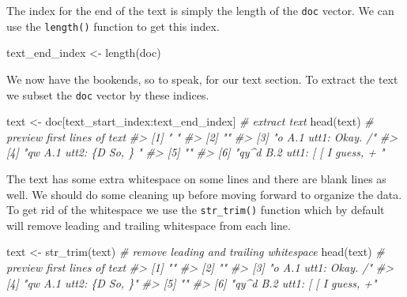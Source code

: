 \documentclass[
]{article}
\newenvironment{Shaded}{\begin{snugshade}}{\end{snugshade}}
\newcommand{\CommentTok}[1]{\textcolor[rgb]{0.56,0.35,0.01}{\textit{#1}}}
\newcommand{\FunctionTok}[1]{\textcolor[rgb]{0.00,0.00,0.00}{#1}}
\newcommand{\NormalTok}[1]{#1}
\newcommand{\OtherTok}[1]{\textcolor[rgb]{0.56,0.35,0.01}{#1}}
\newcommand{\SpecialCharTok}[1]{\textcolor[rgb]{0.00,0.00,0.00}{#1}}
\begin{document}
The index for the end of the text is simply the length of the \texttt{doc} vector. We can use the \texttt{length()} function to get this index.

\begin{Shaded}
\begin{Highlighting}[]
\NormalTok{text\_end\_index }\OtherTok{\textless{}{-}} \FunctionTok{length}\NormalTok{(doc)}
\end{Highlighting}
\end{Shaded}

We now have the bookends, so to speak, for our text section. To extract the text we subset the \texttt{doc} vector by these indices.

\begin{Shaded}
\begin{Highlighting}[]
\NormalTok{text }\OtherTok{\textless{}{-}}\NormalTok{ doc[text\_start\_index}\SpecialCharTok{:}\NormalTok{text\_end\_index]  }\CommentTok{\# extract text}
\FunctionTok{head}\NormalTok{(text)  }\CommentTok{\# preview first lines of \textasciigrave{}text\textasciigrave{}}
\CommentTok{\#\textgreater{} [1] "  "                                       }
\CommentTok{\#\textgreater{} [2] ""                                         }
\CommentTok{\#\textgreater{} [3] "o          A.1 utt1: Okay.  /"            }
\CommentTok{\#\textgreater{} [4] "qw          A.1 utt2: \{D So, \}   "        }
\CommentTok{\#\textgreater{} [5] ""                                         }
\CommentTok{\#\textgreater{} [6] "qy\^{}d          B.2 utt1: [ [ I guess, +   "}
\end{Highlighting}
\end{Shaded}

The text has some extra whitespace on some lines and there are blank lines as well. We should do some cleaning up before moving forward to organize the data. To get rid of the whitespace we use the \texttt{str\_trim()} function which by default will remove leading and trailing whitespace from each line.

\begin{Shaded}
\begin{Highlighting}[]
\NormalTok{text }\OtherTok{\textless{}{-}} \FunctionTok{str\_trim}\NormalTok{(text)  }\CommentTok{\# remove leading and trailing whitespace}
\FunctionTok{head}\NormalTok{(text)  }\CommentTok{\# preview first lines of \textasciigrave{}text\textasciigrave{}}
\CommentTok{\#\textgreater{} [1] ""                                      }
\CommentTok{\#\textgreater{} [2] ""                                      }
\CommentTok{\#\textgreater{} [3] "o          A.1 utt1: Okay.  /"         }
\CommentTok{\#\textgreater{} [4] "qw          A.1 utt2: \{D So, \}"        }
\CommentTok{\#\textgreater{} [5] ""                                      }
\CommentTok{\#\textgreater{} [6] "qy\^{}d          B.2 utt1: [ [ I guess, +"}
\end{Highlighting}
\end{Shaded}
\end{document}
